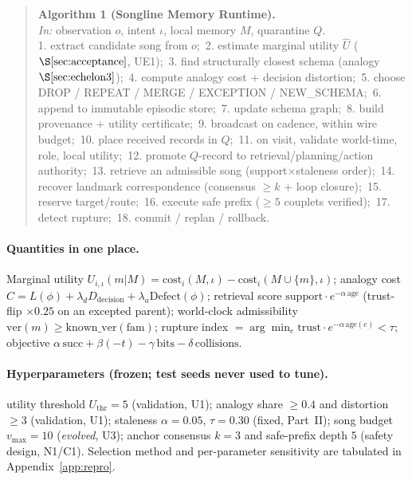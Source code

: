 \documentclass{article}
\begin{document}
\begin{quote}\small
\textbf{Algorithm 1 (Songline Memory Runtime).}\\
\emph{In:} observation $o$, intent $\iota$, local memory $M$,
quarantine $Q$.\\
1. extract candidate song from $o$;\
2. estimate marginal utility $\widehat U$ ($\S\ref{sec:acceptance}$,
UE1);\
3. find structurally closest schema (analogy $\S\ref{sec:echelon3}$);\
4. compute analogy cost + decision distortion;\
5. choose DROP / REPEAT / MERGE / EXCEPTION / NEW\_SCHEMA;\
6. append to immutable episodic store;\
7. update schema graph;\
8. build provenance + utility certificate;\
9. broadcast on cadence, within wire budget;\
10. place received records in $Q$;\
11. on visit, validate world-time, role, local utility;\
12. promote $Q$-record to retrieval/planning/action authority;\
13. retrieve an admissible song (support$\times$staleness order);\
14. recover landmark correspondence (consensus $\ge k$ + loop
closure);\
15. reserve target/route;\
16. execute safe prefix ($\ge 5$ couplets verified);\
17. detect rupture;\
18. commit / replan / rollback.
\end{quote}

\paragraph{Quantities in one place.} Marginal utility
$U_{i,\iota}(m|M)=\mathrm{cost}_i(M,\iota)-\mathrm{cost}_i(M\cup\{m\},
\iota)$; analogy cost $C=L(\phi)+\lambda_d D_{\mathrm{decision}}
+\lambda_a\mathrm{Defect}(\phi)$; retrieval score
$\mathrm{support}\cdot e^{-\alpha\,\mathrm{age}}$ (trust-flip $\times
0.25$ on an excepted parent); world-clock admissibility
$\mathrm{ver}(m)\ge\mathrm{known\_ver}(\mathrm{fam})$; rupture index
$=\arg\min_e \mathrm{trust}\cdot e^{-\alpha\,\mathrm{age}(e)}<\tau$;
objective $\alpha\,\mathrm{succ}+\beta(-t)-\gamma\,\mathrm{bits}
-\delta\,\mathrm{collisions}$.

\paragraph{Hyperparameters (frozen; test seeds never used to tune).}
utility threshold $U_{\mathrm{thr}}{=}5$ (validation, U1); analogy
share $\ge0.4$ and distortion $\ge3$ (validation, U1); staleness
$\alpha{=}0.05$, $\tau{=}0.30$ (fixed, Part~II); song budget
$v_{\max}{=}10$ (\emph{evolved}, U3); anchor consensus $k{=}3$ and
safe-prefix depth $5$ (safety design, N1/C1). Selection method and
per-parameter sensitivity are tabulated in
Appendix~\ref{app:repro}.
\end{document}
